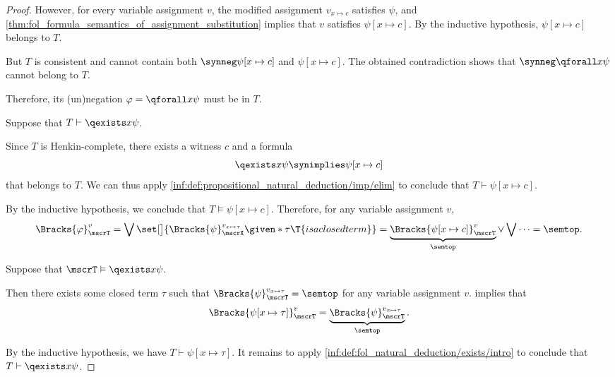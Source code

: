 \begin{proof}
  However, for every variable assignment \( v \), the modified assignment \( v_{x \mapsto c} \) satisfies \( \psi \), and \cref{thm:fol_formula_semantics_of_assignment_substitution} implies that \( v \) satisfies \( \psi[x \mapsto c] \). By the inductive hypothesis, \( \psi[x \mapsto c] \) belongs to \( T \).

  But \( T \) is consistent and cannot contain both \( \synneg \psi[x \mapsto c] \) and \( \psi[x \mapsto c] \). The obtained contradiction shows that \( \synneg \qforall x \psi \) cannot belong to \( T \).

  Therefore, its (un)negation \( \varphi = \qforall x \psi \) must be in \( T \).


  \SufficiencySubProof* Suppose that \( T \vdash \qexists x \psi \).

  Since \( T \) is Henkin-complete, there exists a witness \( c \) and a formula
  \begin{equation*}
    \qexists x \psi \synimplies \psi[x \mapsto c]
  \end{equation*}
  that belongs to \( T \). We can thus apply \ref{inf:def:propositional_natural_deduction/imp/elim} to conclude that \( T \vdash \psi[x \mapsto c] \).

  By the inductive hypothesis, we conclude that \( T \vDash \psi[x \mapsto c] \). Therefore, for any variable assignment \( v \),
  \begin{equation*}
    \Bracks{ \varphi }_\mscrT^v
    =
    \bigvee\set[\big]{ \Bracks{\psi}_\mscrX^{v_{x \mapsto \tau}} \given* \tau \T{is a closed term} }
    =
    \underbrace{\Bracks{\psi[x \mapsto c]}_\mscrT^v}_{\semtop} \vee \bigvee \cdots
    =
    \semtop.
  \end{equation*}

  \NecessitySubProof* Suppose that \( \mscrT \vDash \qexists x \psi \).

  Then there exists some closed term \( \tau \) such that \( \Bracks{\psi}_\mscrT^{v_{x \mapsto \tau}} = \semtop \) for any variable assignment \( v \).  implies that
  \begin{equation*}
    \Bracks{ \psi[x \mapsto \tau] }_\mscrT^v = \underbrace{\Bracks{ \psi }_\mscrT^{v_{x \mapsto \tau}}}_{\semtop}.
  \end{equation*}

  By the inductive hypothesis, we have \( T \vdash \psi[x \mapsto \tau] \). It remains to apply \ref{inf:def:fol_natural_deduction/exists/intro} to conclude that \( T \vdash \qexists x \psi \).
\end{proof}

